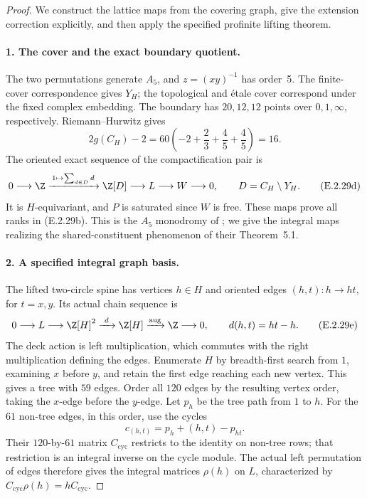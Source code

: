 \begin{proof}
We construct the lattice maps from the covering graph, give
the extension correction explicitly, and then apply the
specified profinite lifting theorem.

\paragraph{1. The cover and the exact boundary quotient.}
The two permutations generate \(A_5\), and
\(z=(xy)^{-1}\) has order~5. The finite-cover correspondence
gives \(Y_H\); the topological and étale cover correspond under
the fixed complex embedding. The boundary has \(20,12,12\)
points over \(0,1,\infty\), respectively. Riemann--Hurwitz gives
\[
 2g(C_H)-2
 =60\left(-2+\frac23+\frac45+\frac45\right)=16.
\]
The oriented exact sequence of the compactification pair is
\[
 0\longrightarrow\Z
 \xrightarrow{\,1\mapsto\sum_{d\in D}d\,}
 \Z[D]\longrightarrow L\longrightarrow W
 \longrightarrow0,\qquad D=C_H\setminus Y_H.
 \tag{E.2.29d}
\]
It is \(H\)-equivariant, and \(P\) is saturated since \(W\)
is free. These maps prove all ranks in (E.2.29b).
This is the \(A_5\) monodromy of
\cite[Example~5.3, p.~13]{AuditBleherChinburgLubotzky2021v3};
we give the integral maps realizing the shared-constituent
phenomenon of their Theorem~5.1.

\paragraph{2. A specified integral graph basis.}
The lifted two-circle spine has vertices \(h\in H\) and
oriented edges \((h,t):h\to ht\), for \(t=x,y\). Its actual
chain sequence is
\[
 0\longrightarrow L\longrightarrow\Z[H]^2
 \xrightarrow{\ d\ }\Z[H]\xrightarrow{\mathrm{aug}}\Z
 \longrightarrow0,\qquad d(h,t)=ht-h.
 \tag{E.2.29e}
\]
The deck action is left multiplication, which commutes
with the right multiplication defining the edges.
Enumerate \(H\) by breadth-first search from \(1\), examining
\(x\) before \(y\), and retain the first edge reaching each
new vertex. This gives a tree with \(59\) edges. Order all
\(120\) edges by the resulting vertex order, taking the
\(x\)-edge before the \(y\)-edge. Let \(p_h\) be the tree path
from \(1\) to \(h\). For the \(61\) non-tree edges, in this
order, use the cycles
\[
 c_{(h,t)}=p_h+(h,t)-p_{ht}.
 \tag{E.2.29f}
\]
Their \(120\)-by-\(61\) matrix \(C_{\mathrm{cyc}}\) restricts
to the identity on non-tree rows; that restriction is an
integral inverse on the cycle module. The actual left
permutation of edges therefore gives the integral matrices
\(\rho(h)\) on \(L\), characterized by
\(C_{\mathrm{cyc}}\rho(h)=hC_{\mathrm{cyc}}\).


\end{proof}
